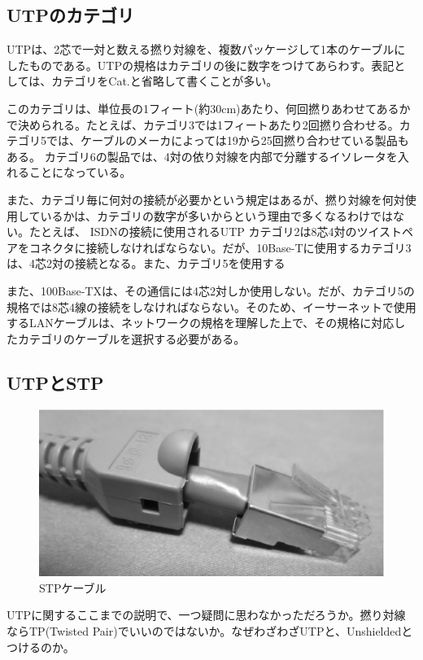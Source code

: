 \subsection{UTPのカテゴリ}

UTPは、2芯で一対と数える撚り対線を、複数パッケージして1本のケーブルにしたものである。UTPの規格はカテゴリの後に数字をつけてあらわす。表記としては、カテゴリをCat.と省略して書くことが多い。

このカテゴリは、単位長の1フィート(約30cm)あたり、何回撚りあわせてあるかで決められる。たとえば、カテゴリ3では1フィートあたり2回撚り合わせる。カテゴリ5では、ケーブルのメーカによっては19から25回撚り合わせている製品もある。
カテゴリ6の製品では、4対の依り対線を内部で分離するイソレータを入れることになっている。

また、カテゴリ毎に何対の接続が必要かという規定はあるが、撚り対線を何対使用しているかは、カテゴリの数字が多いからという理由で多くなるわけではない。たとえば、 ISDNの接続に使用されるUTP カテゴリ2は8芯4対のツイストペアをコネクタに接続しなければならない。だが、10Base-Tに使用するカテゴリ3は、4芯2対の接続となる。また、カテゴリ5を使用する 

また、100Base-TXは、その通信には4芯2対しか使用しない。だが、カテゴリ5の規格では8芯4線の接続をしなければならない。そのため、イーサーネットで使用するLANケーブルは、ネットワークの規格を理解した上で、その規格に対応したカテゴリのケーブルを選択する必要がある。



\subsection{UTPとSTP}

\begin{figure}[htbp]
	\includegraphics[width=12cm,clip]{draw/stp.eps}
	\caption{STPケーブル}
	\label{fig:stp}
\end{figure}

UTPに関するここまでの説明で、一つ疑問に思わなかっただろうか。撚り対線ならTP(Twisted Pair)でいいのではないか。なぜわざわざUTPと、Unshieldedとつけるのか。

